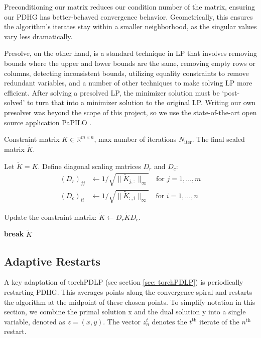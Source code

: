 \documentclass[twoside,12pt,openright]{report}  %
\begin{document}

Preconditioning our matrix reduces our condition number of the matrix, ensuring our PDHG has better-behaved convergence behavior. Geometrically, this ensures the algorithm's iterates stay within a smaller neighborhood, as the singular values vary less dramatically.

Presolve, on the other hand, is a standard technique in LP that involves removing bounds where the upper and lower bounds are the same, removing empty rows or columns, detecting inconsistent bounds, utilizing equality constraints to remove redundant variables, and a number of other techniques to make solving LP more efficient. After solving a presolved LP, the minimizer solution must be `post-solved' to turn that into a minimizer solution to the original LP. Writing our own presolver was beyond the scope of this project, so we use the state-of-the-art open source application PaPILO \cite{papilo}.
\begin{algorithm}[htpb]
\caption{Iterative Ruiz Scaling Algorithm \cite{ruiz2001scaling}}
\label{alg:ruiz_scaling}
\begin{algorithmic}[1]
    \Require Constraint matrix $K \in \mathbb{R}^{m \times n}$, max number of iterations $N_{\text{iter}}$.
    \Ensure The final scaled matrix $\tilde{K}$.
    
    \State Let $\tilde{K} = K$.
        \State Define diagonal scaling matrices $D_r$ and $D_c$:
        \begin{align*}
            (D_r)_{jj} &\leftarrow 1 / \sqrt{\|\tilde{K}_{j,:} \|_{\infty}} \quad \text{for } j=1, \dots, m \\
            (D_c)_{ii} &\leftarrow 1 / \sqrt{\|\tilde{K}_{:,i} \|_{\infty}} \quad \text{for } i=1, \dots, n
        \end{align*}
        
        \State Update the constraint matrix: $\tilde{K} \leftarrow D_r \tilde{K} D_c$.
        
        \State {}
            \State \textbf{break} 
        \EndIf
    \EndFor
    \State \Return $\tilde{K}$
\end{algorithmic}
\end{algorithm}


\subsection{Adaptive Restarts}\label{sec:restart}
A key adaptation of torchPDLP (see section \ref{sec: torchPDLP}) is periodically restarting PDHG. This averages points along the convergence spiral and restarts the algorithm at the midpoint of these chosen points. To simplify notation in this section, we combine the primal solution x and the dual solution y into a single variable, denoted as $z=(x,y)$. The vector $z_n^t$ denotes the $t^{\text{th}}$ iterate of the $n^\text{th}$ restart.
\end{document}
